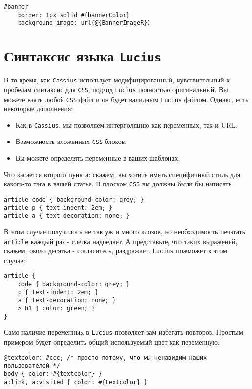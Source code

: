 \begin{lstlisting}
#banner
    border: 1px solid #{bannerColor}
    background-image: url(@{BannerImageR})
\end{lstlisting}

\section{Синтаксис языка \texttt{Lucius}}

В то время, как \texttt{Cassius} использует модифицированный, чувствительный к
пробелам синтаксис для \texttt{CSS}, подход \texttt{Lucius} полностью
оригинальный. Вы можете взять любой \texttt{CSS} файл и он будет валидным
\texttt{Lucius} файлом. Однако, есть некоторые дополнения:

\begin{itemize}
    \item Как в \texttt{Cassius}, мы позволяем интерполяцию как переменных, так
        и URL.
    \item Возможность вложенных \texttt{CSS} блоков.
    \item Вы можете определять переменные в ваших шаблонах.
\end{itemize}

Что касается второго пункта: скажем, вы хотите иметь специфичный стиль для
какого-то тэга в вашей статье. В плоском \texttt{CSS} вы должны были бы
написать

\begin{lstlisting}
article code { background-color: grey; }
article p { text-indent: 2em; }
article a { text-decoration: none; }
\end{lstlisting}

В этом случае получилось не так уж и много клозов, но необходимость печатать
\texttt{article} каждый раз - слегка надоедает. А представьте, что таких
выражений, скажем, около десятка - согласитесь, раздражает.  \texttt{Lucius}
пожможет в этом случае:

\begin{lstlisting}
article {
    code { background-color: grey; }
    p { text-indent: 2em; }
    a { text-decoration: none; }
    > h1 { color: green; }
}
\end{lstlisting}

Само наличие переменныx в \texttt{Lucius} позволяет вам избегать повторов.
Простым примером будет определить общий используемый цвет как переменную:

\begin{lstlisting}
@textcolor: #ccc; /* просто потому, что мы ненавидим наших пользователей */
body { color: #{textcolor} }
a:link, a:visited { color: #{textcolor} }
\end{lstlisting}

